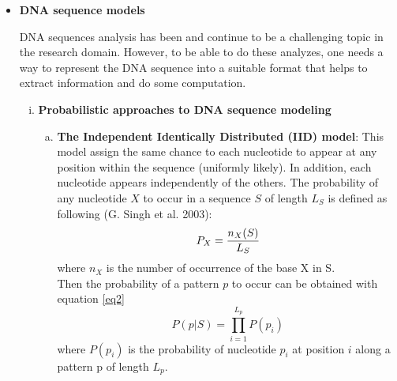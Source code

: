 \documentclass[10pt,twocolumn,letterpaper]{article}
\begin{document}
{\begin{itemize}
   \item \textbf{DNA sequence models}
   \par{
       DNA sequences analysis has been and continue to be a challenging topic in the research domain. However, to be able to do these analyzes, one needs a way to represent the DNA sequence into a suitable format 
       that helps to extract information and do some computation.
       \begin{enumerate}[i.]
           \item \textbf{Probabilistic approaches to DNA sequence modeling}
           \begin{enumerate}[a.]
               \item \textbf{The Independent Identically Distributed (IID) model}: This model assign the same chance to each nucleotide to appear at any position within the sequence (uniformly likely).
               In addition, each nucleotide appears independently of the others. The probability of any nucleotide \(X\) to occur in a sequence \(S\) of length \(L_S\) is defined as following (G. Singh et al. 2003):
               \begin{equation}
                   P_X = \frac{n_{X}(S)}{L_S}\\
               \end{equation}
               where \(n_X\) is the number of occurrence of the base X in S.\\
               Then the probability of a pattern \(p\) to occur can be obtained with equation \ref{eq2}
               \begin{equation}
                    P(p | S) = \prod_{i=1}^{L_p} P(p_i)
                   \label{eq2}
               \end{equation}
               where \(P(p_i)\) is the probability of nucleotide \(p_i\) at position \(i\) along a pattern p of length \(L_p\).\\
               

\end{enumerate}
\end{enumerate}}
\end{itemize}}
\end{document}
